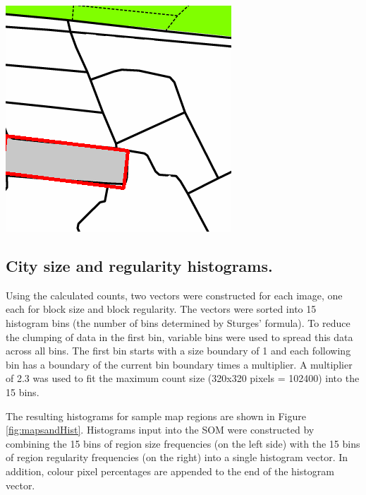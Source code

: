 \documentclass{nature}
\makeatletter
\renewenvironment*{figure}{\@float{figure}}{\end@float}
\makeatother
\begin{document}
\begin{methods}
\begin{figure}
\includegraphics[scale=0.3]{Images/Floodfill/image_8.png}  
  
\caption{\bf Results of flood filled city blocks. Flood fills of each individual region to determine region size (count of pixels in grey). Differences between counts of pixels within bounding boxes (outlined in red) used a measure of regularity.}    
 \label{fig:floodfilled}  
\end{figure} 

\subsection{City size and regularity histograms.}\label{methodshist}

Using the calculated counts, two vectors were constructed for each image, one each for block size and block regularity. The vectors were sorted into 15 histogram bins (the number of bins determined by Sturges' formula\cite{Sturges1926}). To reduce the clumping of data in the first bin, variable bins were used to spread this data across all bins. The first bin starts with a size boundary of 1 and each following bin has a boundary of the current bin boundary times a multiplier. A multiplier of 2.3 was used to fit the maximum count size (320x320 pixels = 102400) into the 15 bins.

The resulting histograms for sample map regions are shown in Figure \ref{fig:mapsandHist}. Histograms input into the SOM were constructed by combining the 15 bins of region size frequencies (on the left side) with the 15 bins of region regularity frequencies (on the right) into a single histogram vector. In addition, colour pixel percentages are appended to the end of the histogram vector.



\end{methods}
\end{document}
